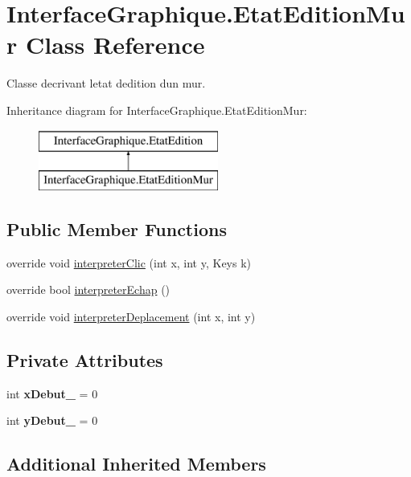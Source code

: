 \hypertarget{class_interface_graphique_1_1_etat_edition_mur}{}\section{Interface\+Graphique.\+Etat\+Edition\+Mur Class Reference}
\label{class_interface_graphique_1_1_etat_edition_mur}


Classe decrivant l\textquotesingle{}etat d\textquotesingle{}edition d\textquotesingle{}un mur.  


Inheritance diagram for Interface\+Graphique.\+Etat\+Edition\+Mur\+:\begin{figure}[H]
\begin{center}
\leavevmode
\includegraphics[height=2.000000cm]{class_interface_graphique_1_1_etat_edition_mur}
\end{center}
\end{figure}
\subsection*{Public Member Functions}
\begin{DoxyCompactItemize}
\item 
override void \hyperlink{group__inf2990_gad13a89d6605d4326b0080215502a5fb2}{interpreter\+Clic} (int x, int y, Keys k)
\item 
override bool \hyperlink{group__inf2990_ga8d021b397d9ebd210158236d43df2207}{interpreter\+Echap} ()
\item 
override void \hyperlink{group__inf2990_ga71cbbc58a1d9770318042607ccf474c1}{interpreter\+Deplacement} (int x, int y)
\end{DoxyCompactItemize}
\subsection*{Private Attributes}
\begin{DoxyCompactItemize}
\item 
int {\bfseries x\+Debut\+\_\+} = 0
\item 
int {\bfseries y\+Debut\+\_\+} = 0
\end{DoxyCompactItemize}
\subsection*{Additional Inherited Members}


